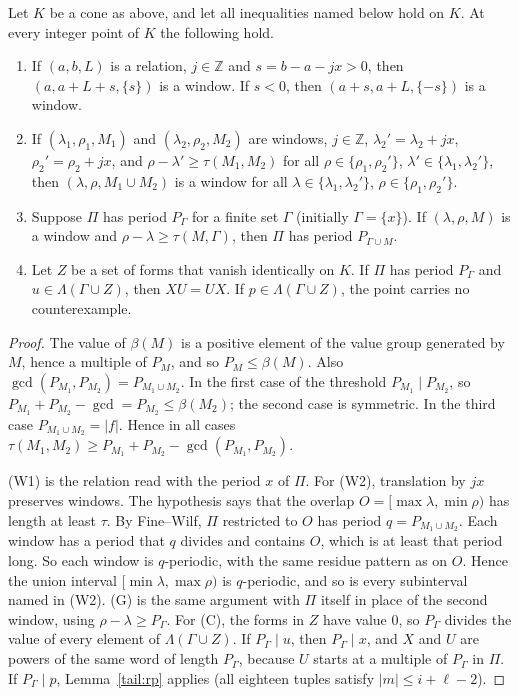 \begin{lemma}\label{tail:rules}
Let \(K\) be a cone as above, and let all inequalities named below hold on \(K\). At every integer point of \(K\) the following hold.
\begin{enumerate}
\item[(W1)] If \((a,b,L)\) is a relation, \(j\in\mathbb Z\) and \(s=b-a-jx>0\), then \((a,a+L+s,\{s\})\) is a window. If \(s<0\), then \((a+s,a+L,\{-s\})\) is a window.
\item[(W2)] If \((\lambda_1,\rho_1,M_1)\) and \((\lambda_2,\rho_2,M_2)\) are windows, \(j\in\mathbb Z\), \(\lambda_2'=\lambda_2+jx\), \(\rho_2'=\rho_2+jx\), and \(\rho-\lambda'\ge\tau(M_1,M_2)\) for all \(\rho\in\{\rho_1,\rho_2'\}\), \(\lambda'\in\{\lambda_1,\lambda_2'\}\), then \((\lambda,\rho,M_1\cup M_2)\) is a window for all \(\lambda\in\{\lambda_1,\lambda_2'\}\), \(\rho\in\{\rho_1,\rho_2'\}\).
\item[(G)] Suppose \(\Pi\) has period \(P_\Gamma\) for a finite set \(\Gamma\) (initially \(\Gamma=\{x\}\)). If \((\lambda,\rho,M)\) is a window and \(\rho-\lambda\ge\tau(M,\Gamma)\), then \(\Pi\) has period \(P_{\Gamma\cup M}\).
\item[(C)] Let \(Z\) be a set of forms that vanish identically on \(K\). If \(\Pi\) has period \(P_\Gamma\) and \(u\in\Lambda(\Gamma\cup Z)\), then \(XU=UX\). If \(p\in\Lambda(\Gamma\cup Z)\), the point carries no counterexample.
\end{enumerate}
\end{lemma}
\begin{proof}
The value of \(\beta(M)\) is a positive element of the value group generated by \(M\), hence a multiple of \(P_M\), and so \(P_M\le\beta(M)\). Also \(\gcd(P_{M_1},P_{M_2})=P_{M_1\cup M_2}\). In the first case of the threshold \(P_{M_1}\mid P_{M_2}\), so \(P_{M_1}+P_{M_2}-\gcd=P_{M_2}\le\beta(M_2)\); the second case is symmetric. In the third case \(P_{M_1\cup M_2}=|f|\). Hence in all cases \(\tau(M_1,M_2)\ge P_{M_1}+P_{M_2}-\gcd(P_{M_1},P_{M_2})\).

(W1) is the relation read with the period \(x\) of \(\Pi\). For (W2), translation by \(jx\) preserves windows. The hypothesis says that the overlap \(O=[\max\lambda,\min\rho)\) has length at least \(\tau\). By Fine--Wilf, \(\Pi\) restricted to \(O\) has period \(q=P_{M_1\cup M_2}\). Each window has a period that \(q\) divides and contains \(O\), which is at least that period long. So each window is \(q\)-periodic, with the same residue pattern as on \(O\). Hence the union interval \([\min\lambda,\max\rho)\) is \(q\)-periodic, and so is every subinterval named in (W2). (G) is the same argument with \(\Pi\) itself in place of the second window, using \(\rho-\lambda\ge P_\Gamma\). For (C), the forms in \(Z\) have value \(0\), so \(P_\Gamma\) divides the value of every element of \(\Lambda(\Gamma\cup Z)\). If \(P_\Gamma\mid u\), then \(P_\Gamma\mid x\), and \(X\) and \(U\) are powers of the same word of length \(P_\Gamma\), because \(U\) starts at a multiple of \(P_\Gamma\) in \(\Pi\). If \(P_\Gamma\mid p\), Lemma~\ref{tail:rp} applies (all eighteen tuples satisfy \(|m|\le i+\ell-2\)).
\end{proof}

